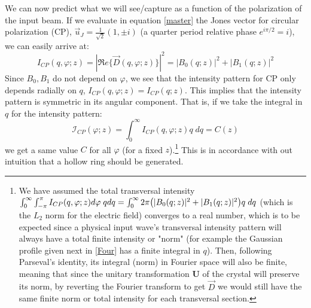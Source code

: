 \documentclass[11pt, a4paper, twoside]{article} %
\begin{document}
We can now predict what we will see/capture as a function of the polarization of the input beam. If we evaluate in equation \eqref{master} the Jones vector for circular polarization (CP), $\vec{u}_J=\frac{1}{\sqrt{2}}(1,\pm i)$ (a quarter period relative phase $e^{i\pi/2}=i$), we can easily arrive at:
\begin{equation}
I_{CP}(q,\varphi;z)=|\mathfrak{R}e\{\vec{D}(q,\varphi;z)\}|^2=|B_0(q;z)|^2+|B_1(q;z)|^2
\end{equation}
Since $B_0,B_1$ do not depend on $\varphi$, we see that the intensity pattern for CP only depends radially on $q$, $I_{CP}(q,\varphi;z)=I_{CP}(q;z)$. This implies that the intensity pattern is symmetric in its angular component. That is, if we take the integral in $q$ for the intensity pattern:\vspace{-0.1cm}
\begin{equation}\label{yoyo}
\mathcal{I}_{CP}(\varphi;z)=\int_0^\infty I_{CP}(q,\varphi;z)q\;dq=C(z)
\end{equation}
we get a same value $C$ for all $\varphi$ (for a fixed $z$).\footnote{We have assumed the total transversal intensity $\int_0^\infty \int_{-\pi}^{\pi}I_{CP}(q,\varphi;z)d\varphi\;qdq=\int_0^\infty2\pi\qty(|B_0(q;z)|^2+|B_1(q;z)|^2)q\;dq$ (which is the $L_2$ norm for the electric field) converges to a real number, which is to be expected since a physical input wave's transversal intensity pattern will always have a total finite intensity or "norm" (for example the Gaussian profile given next in \eqref{Four} has a finite integral in $q$). Then, following Parseval's identity, its integral (norm) in Fourier space will also be finite, meaning that since the unitary transformation $\pmb{U}$ of the crystal will preserve its norm, by reverting the Fourier transform to get $\vec{D}$ we would still have the same finite norm or total intensity for each transversal section.  } This is in accordance with out intuition that a hollow ring should be generated.\vspace{-0.1cm}
\end{document}
